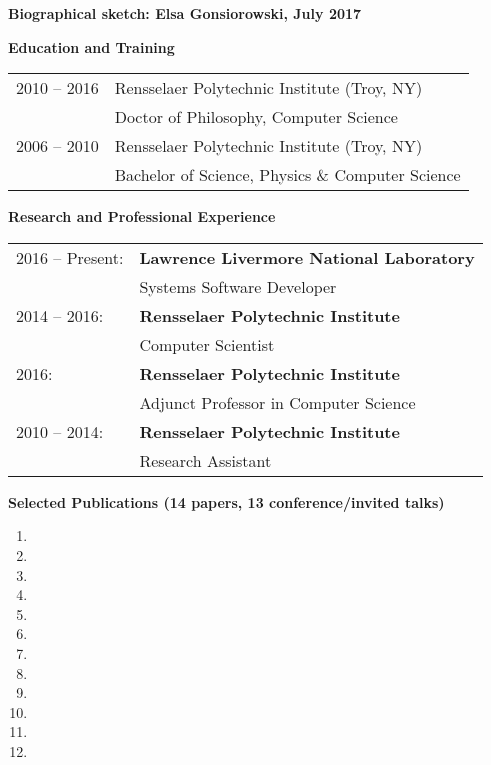 \documentclass[times,11pt]{article}    %
\begin{document}
\begin{center}
\textbf{\sffamily\large Biographical sketch: Elsa Gonsiorowski, July 2017}
\end{center}

\vskip 3pt
\textbf{\sffamily Education and Training}
\vskip 3pt

\begin{tabular}{ll}
\\
2010 -- 2016 & Rensselaer Polytechnic Institute (Troy, NY)\\
             & Doctor of Philosophy, Computer Science\\
2006 -- 2010 & Rensselaer Polytechnic Institute (Troy, NY)\\
             & Bachelor of Science, Physics \& Computer Science\\
\end{tabular}

\vskip 3pt
\textbf{\sffamily Research and Professional Experience}
\vskip 3pt

\begin{tabular}{ll}
2016 -- Present: & 
\textbf{Lawrence Livermore National Laboratory}\\
 & Systems Software Developer \\

2014 -- 2016: &
\textbf{Rensselaer Polytechnic Institute}\\
 & Computer Scientist \\

2016: & 
\textbf{Rensselaer Polytechnic Institute}\\
 & Adjunct Professor in Computer Science \\

2010 -- 2014: & 
\textbf{Rensselaer Polytechnic Institute}\\
 & Research Assistant \\
\end{tabular}

\vskip 3pt
\textbf{\sffamily Selected Publications (14 papers, 13 conference/invited talks)}

\begin{enumerate}
\item {}
\item {}
\item {}
\item {}
\item {}
\item {}
\item {}
\item {}
\item {}
\item {}
\item {}
\item {}
\end{enumerate}
\end{document}
